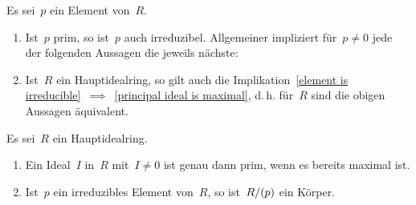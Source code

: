 \begin{proposition}
  \label{connection between prime and irreducible}
  Es sei~$p$ ein Element von~$R$.
  \begin{enumerate}
    \item
      Ist~$p$ prim, so ist~$p$ auch irreduzibel.
      Allgemeiner impliziert für~$p \neq 0$ jede der folgenden Aussagen die jeweils nächste:
    \item
      Ist~$R$ ein Hauptidealring, so gilt auch die Implikation~\ref{element is irreducible}~$\implies$~\ref{principal ideal is maximal}, d.\,h. für~$R$ sind die obigen Aussagen äquivalent.
  \end{enumerate}
\end{proposition}

\begin{corollary}
  Es sei~$R$ ein Hauptidealring.
  \begin{enumerate}
    \item
      Ein Ideal~$I$ in~$R$ mit~$I \neq 0$ ist genau dann prim, wenn es bereits maximal ist.
    \item
      Ist~$p$ ein irreduzibles Element von~$R$, so ist~$R / (p)$ ein Körper.
  \end{enumerate}
\end{corollary}

